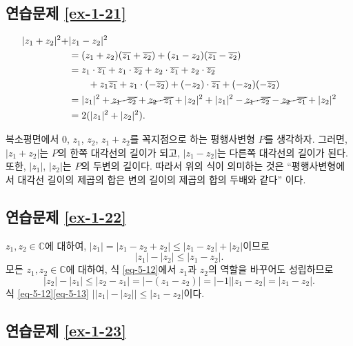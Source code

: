 \subsection*{연습문제 \ref{ex-1-21}}

\begin{align*}
|z_1+z_2|^2 + & |z_1 - z_2|^2 \\
&= (z_1 + z_2)(\overline{z_1} + \overline{z_2}) + (z_1 - z_2)(\overline{z_1} - \overline{z_2}) \\
&= z_1\cdot \overline{z_1} + z_1 \cdot \overline{z_2} + z_2 \cdot \overline{z_1}
+ z_2\cdot \overline{z_2} \\
&\qquad + z_1\overline{z_1} + z_1\cdot(-\overline{z_2}) + (-z_2)\cdot\overline{z_1}
+ (-z_2)(-\overline{z_2}) \\
& = |z_1|^2 + \cancel{z_1 \cdot \overline{z_2}} + \cancel{z_2 \cdot \overline{z_1}}
+ |z_2|^2 + |z_1|^2 - \cancel{z_1 \cdot \overline{z_2}}  
- \cancel{z_2 \cdot \overline{z_1}} + |z_2|^2 \\
&= 2(|z_1|^2 + |z_2|^2).
\end{align*}

복소평면에서 $0$, $z_1$, $z_2$, $z_1+z_2$를 꼭지점으로 하는 평행사변형 $P$를 생각하자.
그러면, $|z_1+z_2|$는 $P$의 한쪽 대각선의 길이가 되고,
$|z_1-z_2|$는 다른쪽 대각선의 길이가 된다. 또한, $|z_1|$, $|z_2|$는
$P$의 두변의 길이다. 따라서 위의 식이 의미하는 것은
``평행사변형에서 대각선 길이의 제곱의 합은 변의 길이의 제곱의 합의 두배와 같다'' 이다.

\subsection*{연습문제 \ref{ex-1-22}}

$z_1, z_2\in\mathbb C$에 대하여,
$|z_1| = |z_1 - z_2 + z_2| \le |z_1 - z_2| + |z_2|$이므로
\begin{equation} \label{eq-5-12}
|z_1| - |z_2| \le |z_1 - z_2|.
\end{equation}
모든 $z_1, z_2\in\mathbb C$에 대하여,
식 \eqref{eq-5-12}에서 $z_1$과 $z_2$의 역할을 바꾸어도 성립하므로
\begin{equation}\label{eq-5-13}
|z_2| - |z_1| \le |z_2 - z_1| = |-(z_1-z_2)|
= |-1| |z_1-z_2| =|z_1-z_2|.
\end{equation}
식 \ref{eq-5-12}\와 \ref{eq-5-13} 
$\big| |z_1| -|z_2| \big| \le |z_1 - z_2|$이다.

\subsection*{연습문제 \ref{ex-1-23}}

